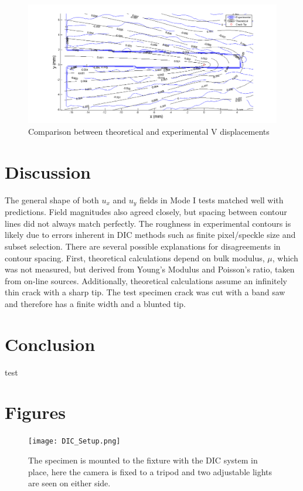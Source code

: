 \documentclass[12pt]{article}
\begin{document}
\begin{figure}[H]
	\centering
	\includegraphics[width=1\textwidth]{contourCompare_8_2.png}
	\caption{Comparison between theoretical and experimental V displacements}
	\label{fig:cc2}
\end{figure}


\section{Discussion}%
The general shape of both $u_x$ and $u_y$ fields in Mode I tests matched well with predictions. Field magnitudes also agreed closely, but spacing between contour lines did not always match perfectly. The roughness in experimental contours is likely due to errors inherent in DIC methods such as finite pixel/speckle size and subset selection. There are several possible explanations for disagreements in contour spacing. First, theoretical calculations depend on bulk modulus, $\mu$, which was not measured, but derived from Young's Modulus and Poisson's ratio, taken from on-line sources. Additionally, theoretical calculations assume an infinitely thin crack with a sharp tip. The test specimen crack was cut with a band saw and therefore has a finite width and a blunted tip. 
\section{Conclusion}%
test
\section{Figures}
\begin{figure}[H]
	\centering
	\texttt{[image: DIC\_Setup.png]}
	\caption{The specimen is mounted to the fixture with the DIC system in place, here the camera is fixed to a tripod and two adjustable lights are seen on either side.}
	\label{fig:DIC}
\end{figure}
\end{document}
